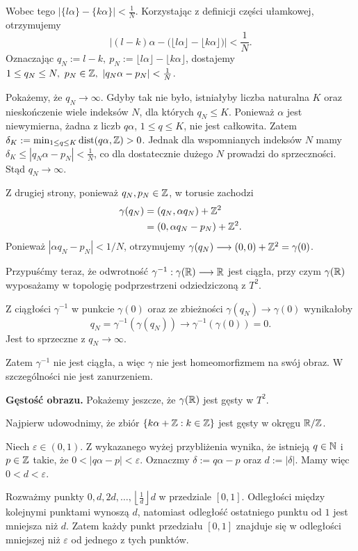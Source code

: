 \begin{uwaga}
Wobec tego $|\{l\alpha\}-\{k\alpha\}|<\frac1N$.
Korzystając z definicji części ułamkowej,
otrzymujemy
\[
\left|
(l-k)\alpha-
\bigl(\lfloor l\alpha\rfloor
-\lfloor k\alpha\rfloor\bigr)
\right|<\frac1N.
\]
Oznaczając $q_N:=l-k,\ p_N:=\lfloor l\alpha\rfloor -\lfloor k\alpha\rfloor$,
dostajemy $1\le q_N\le N,\ p_N\in\Z, \ |q_N\alpha-p_N|<\frac1N$.

Pokażemy, że $q_N\to\infty$.
Gdyby tak nie było, istniałyby liczba
naturalna $K$ oraz nieskończenie wiele
indeksów $N$, dla których $q_N\le K$.
Ponieważ $\alpha$ jest niewymierna,
żadna z liczb $q\alpha$, $1\le q\le K$,
nie jest całkowita. Zatem $\delta_K:= \min_{1\le q\le K} \operatorname{dist}(q\alpha,\mathbb{Z})>0$.
Jednak dla wspomnianych indeksów $N$ mamy $\delta_K \le |q_N\alpha-p_N| <\frac1N$,
co dla dostatecznie dużego $N$ prowadzi
do sprzeczności. Stąd $q_N\to\infty$.

Z drugiej strony, ponieważ $q_N,p_N\in\mathbb{Z}$,
w torusie zachodzi
\[
\begin{aligned}
\gamma(q_N)
&=(q_N,\alpha q_N)+\mathbb{Z}^2\\
&=(0,\alpha q_N-p_N)+\mathbb{Z}^2.
\end{aligned}
\]
Ponieważ $|\alpha q_N-p_N|<1/N$, otrzymujemy $\gamma(q_N)\longrightarrow(0,0)+\mathbb{Z}^2 =\gamma(0)$.

Przypuśćmy teraz, że odwrotność $\gamma^{-1}:\gamma(\mathbb{R})\longrightarrow\mathbb{R}$
jest ciągła, przy czym $\gamma(\mathbb{R})$
wyposażamy w topologię podprzestrzeni
odziedziczoną z $T^2$.

Z ciągłości $\gamma^{-1}$ w punkcie
$\gamma(0)$ oraz ze zbieżności
$\gamma(q_N)\to\gamma(0)$ wynikałoby
\[
q_N
=\gamma^{-1}(\gamma(q_N))
\longrightarrow
\gamma^{-1}(\gamma(0))=0.
\]
Jest to sprzeczne z $q_N\to\infty$.

Zatem $\gamma^{-1}$ nie jest ciągła,
a więc $\gamma$ nie jest homeomorfizmem
na swój obraz. W szczególności nie jest
zanurzeniem.

\smallskip
\noindent\textbf{Gęstość obrazu.}
Pokażemy jeszcze, że $\gamma(\mathbb{R})$ jest
gęsty w $T^2$.

Najpierw udowodnimy, że zbiór $\{k\alpha+\mathbb{Z}:k\in\mathbb{Z}\}$
jest gęsty w okręgu $\mathbb{R}/\mathbb{Z}$.

Niech $\varepsilon\in(0,1)$.
Z wykazanego wyżej przybliżenia wynika,
że istnieją $q\in\mathbb{N}$ i $p\in\mathbb{Z}$ takie, że $0<|q\alpha-p|<\varepsilon$.
Oznaczmy $\delta:=q\alpha-p$ oraz
$d:=|\delta|$. Mamy więc $0<d<\varepsilon$.

Rozważmy punkty $0,d,2d,\ldots,\left\lfloor\frac1d\right\rfloor d$
w przedziale $[0,1]$.
Odległości między kolejnymi punktami
wynoszą $d$, natomiast odległość ostatniego
punktu od $1$ jest mniejsza niż $d$.
Zatem każdy punkt przedziału $[0,1]$
znajduje się w odległości mniejszej niż
$\varepsilon$ od jednego z tych punktów.


\end{uwaga}
